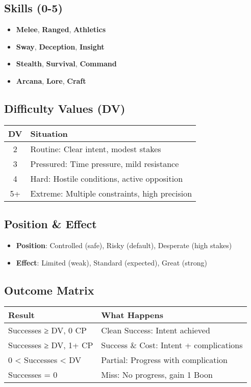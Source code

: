 \documentclass[11pt]{article}
\begin{document}
\subsection{Skills (0-5)}
\begin{itemize}
    \item \textbf{Melee}, \textbf{Ranged}, \textbf{Athletics}
    \item \textbf{Sway}, \textbf{Deception}, \textbf{Insight}
    \item \textbf{Stealth}, \textbf{Survival}, \textbf{Command}
    \item \textbf{Arcana}, \textbf{Lore}, \textbf{Craft}
\end{itemize}

\subsection{Difficulty Values (DV)}
\begin{center}
\begin{tabular}{cl}
\toprule
\textbf{DV} & \textbf{Situation} \\
\midrule
2 & Routine: Clear intent, modest stakes \\
3 & Pressured: Time pressure, mild resistance \\
4 & Hard: Hostile conditions, active opposition \\
5+ & Extreme: Multiple constraints, high precision \\
\bottomrule
\end{tabular}
\end{center}

\subsection{Position \& Effect}
\begin{itemize}
    \item \textbf{Position}: Controlled (safe), Risky (default), Desperate (high stakes)
    \item \textbf{Effect}: Limited (weak), Standard (expected), Great (strong)
\end{itemize}

\subsection{Outcome Matrix}
\begin{center}
\begin{tabular}{ll}
\toprule
\textbf{Result} & \textbf{What Happens} \\
\midrule
Successes ≥ DV, 0 CP & Clean Success: Intent achieved \\
Successes ≥ DV, 1+ CP & Success \& Cost: Intent + complications \\
0 < Successes < DV & Partial: Progress with complication \\
Successes = 0 & Miss: No progress, gain 1 Boon \\
\bottomrule
\end{tabular}
\end{center}
\end{document}
